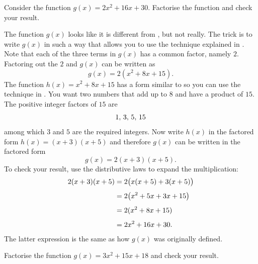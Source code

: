 \documentclass[a4paper,oneside,12pt]{article}
\begin{document}
\begin{example}
Consider the function $g(x) = 2x^2 + 16x + 30$.  Factorise the
function and check your result.
\end{example}

\begin{solution}
The function $g(x)$ looks like it is different from
, but not really.  The trick
is to write $g(x)$ in such a way that allows you to use the technique
explained in .  Note that each of
the three terms in $g(x)$ has a common factor, namely $2$.  Factoring
out the $2$ and $g(x)$ can be written as
\[
g(x)
=
2 (x^2 + 8x + 15).
\]
The function $h(x) = x^2 + 8x + 15$ has a form similar to
 so you can use the technique
in .  You want two numbers that
add up to $8$ and have a product of $15$.  The positive integer
factors of $15$ are
\[
{1},\, {3},\, {5},\, {15}
\]
among which $3$ and $5$ are the required integers.  Now write $h(x)$
in the factored form $h(x) = (x + 3) (x + 5)$ and therefore $g(x)$ can
be written in the factored form
\[
g(x)
=
2 (x + 3) (x + 5).
\]
To check your result, use the distributive laws to expand the
multiplication:
\begin{align*}
2 (x + 3) (x + 5)
&=
2 \big(x(x + 5) + 3(x + 5)\big) \\[4pt]
&=
2 \big(x^2 + 5x + 3x + 15\big) \\[4pt]
&=
2 (x^2 + 8x + 15) \\[4pt]
&=
2x^2 + 16x + 30.
\end{align*}
The latter expression is the same as how $g(x)$ was originally
defined.
\end{solution}

\begin{exercise}
Factorise the function $g(x) = 3x^2 + 15x + 18$ and check your
result.
\end{exercise}

\end{document}
